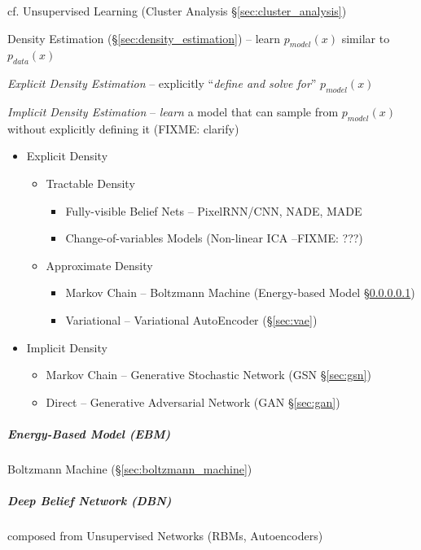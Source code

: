 cf. Unsupervised Learning (Cluster Analysis \S\ref{sec:cluster_analysis})

Density Estimation (\S\ref{sec:density_estimation}) -- learn $p_{model}(x)$
similar to $p_{data}(x)$

\emph{Explicit Density Estimation} -- explicitly ``\emph{define and solve for}''
$p_{model}(x)$

\emph{Implicit Density Estimation} -- \emph{learn} a model that can sample from
$p_{model}(x)$ without explicitly defining it (FIXME: clarify)

\begin{itemize}
  \item Explicit Density
  \begin{itemize}
    \item Tractable Density
      \begin{itemize}
        \item Fully-visible Belief Nets -- PixelRNN/CNN, NADE, MADE
        \item Change-of-variables Models (Non-linear ICA --FIXME: ???)
      \end{itemize}
    \item Approximate Density
    \begin{itemize}
      \item Markov Chain -- Boltzmann Machine (Energy-based Model
        \S\ref{sec:ebm})
      \item Variational -- Variational AutoEncoder (\S\ref{sec:vae})
    \end{itemize}
  \end{itemize}
  \item Implicit Density
  \begin{itemize}
    \item Markov Chain -- Generative Stochastic Network (GSN \S\ref{sec:gsn})
    \item Direct -- Generative Adversarial Network (GAN \S\ref{sec:gan})
  \end{itemize}
\end{itemize}



\subparagraph{Energy-Based Model (EBM)}\label{sec:ebm}\hfill

Boltzmann Machine (\S\ref{sec:boltzmann_machine})



\subparagraph{Deep Belief Network (DBN)}\label{sec:dbn}\hfill

composed from Unsupervised Networks (RBMs, Autoencoders)



